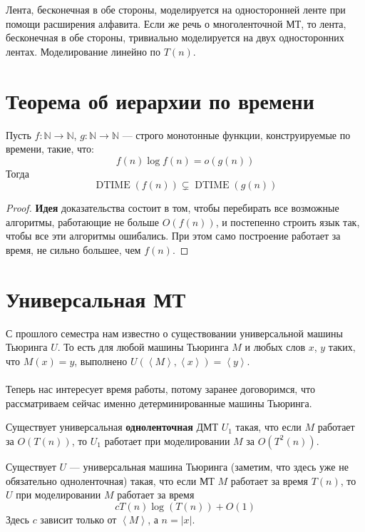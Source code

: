 \documentclass[11pt]{article}
\DeclareMathOperator{\DTIME}{DTIME}
\begin{document}
\begin{remark}
    Лента, бесконечная в обе стороны, моделируется на односторонней ленте при помощи расширения алфавита. Если же речь о многоленточной МТ, то лента, бесконечная в обе стороны, тривиально моделируется на двух односторонних лентах. Моделирование линейно по $T(n)$.
\end{remark}

\section{Теорема об иерархии по времени}

\begin{theorem}
    Пусть $f \colon \mathbb{N} \to \mathbb{N}$, $g \colon \mathbb{N} \to \mathbb{N}$ --- строго монотонные функции, конструируемые по времени, такие, что:
    \[f(n) \log f(n) = o(g(n))\]
    Тогда
    \[\DTIME(f(n)) \varsubsetneq \DTIME(g(n))\]
\end{theorem}

\begin{proof}
    \textbf{Идея} доказательства состоит в том, чтобы перебирать все возможные алгоритмы, работающие не больше $O(f(n))$, и постепенно строить язык так, чтобы все эти алгоритмы ошибались. При этом само построение работает за время, не сильно большее, чем $f(n)$.
\end{proof}

\section{Универсальная МТ}

С прошлого семестра нам известно о существовании универсальной машины Тьюринга $U$. То есть для любой машины Тьюринга $M$ и любых слов $x$, $y$ таких, что $M(x) = y$, выполнено $U(\left\langle M \right\rangle, \left\langle x \right\rangle) = \left\langle y \right\rangle$.
\\ \\
Теперь нас интересует время работы, потому заранее договоримся, что рассматриваем сейчас именно детерминированные машины Тьюринга.

\begin{theorem}
    Существует универсальная \textbf{одноленточная} ДМТ $U_1$ такая, что если $M$ работает за $O(T(n))$, то $U_1$ работает при моделировании $M$ за $O(T^2(n))$.
\end{theorem}

\begin{theorem}
    Существует $U$ --- универсальная машина Тьюринга (заметим, что здесь уже не обязательно одноленточная) такая, что если МТ $M$ работает за время $T(n)$, то $U$ при моделировании $M$ работает за время
    \[cT(n) \log(T(n)) + O(1)\]
    Здесь $c$ зависит только от $\left\langle M \right\rangle$, а $n = \left\lvert x \right\rvert$.
\end{theorem}
\end{document}
